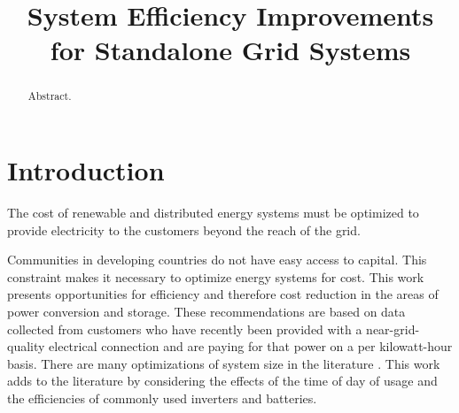 \documentclass[conference]{IEEEtran}
\title{System Efficiency Improvements for Standalone Grid Systems}
\begin{document}


\maketitle

\begin{abstract}
Abstract.
\end{abstract}

\section{Introduction}

The cost of renewable and distributed energy systems must be
optimized to provide electricity to the customers beyond the
reach of the grid.

Communities in developing countries do not have easy access
to capital.
This constraint makes it necessary to optimize energy systems
for cost.
This work presents opportunities for efficiency and therefore
cost reduction in the areas of power conversion and storage.
These recommendations are based on data collected from customers
who have recently been provided with a near-grid-quality
electrical connection and are paying for that power on a
per kilowatt-hour basis.
There are many optimizations of system size in the literature
\cite{optimizations}.
This work adds to the literature by considering the effects
of the time of day of usage and the efficiencies of commonly
used inverters and batteries.
\end{document}
